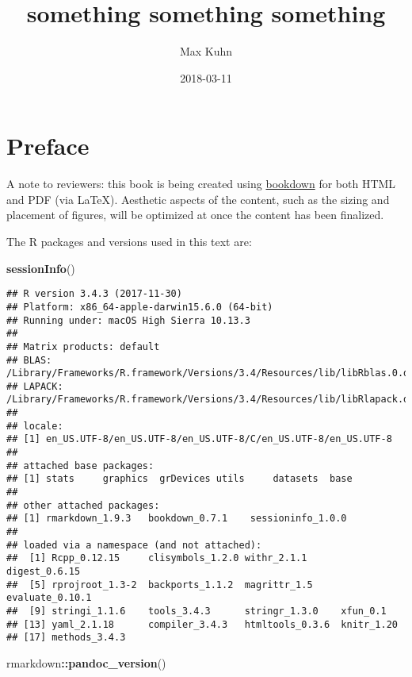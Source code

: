 \documentclass[numberinsequence]{krantz}
\title{something something something}
\author{Max Kuhn}
\date{2018-03-11}
\makeatletter
\newenvironment{Shaded}{\begin{snugshade}}{\end{snugshade}}
\newcommand{\KeywordTok}[1]{\textcolor[rgb]{0.13,0.29,0.53}{\textbf{#1}}}
\newcommand{\NormalTok}[1]{#1}
\newcommand{\OperatorTok}[1]{\textcolor[rgb]{0.81,0.36,0.00}{\textbf{#1}}}
\newenvironment{kframe}{%
\medskip{}
\setlength{\fboxsep}{.8em}
 \def\at@end@of@kframe{}%
 \ifinner\ifhmode%
  \def\at@end@of@kframe{\end{minipage}}%
  \begin{minipage}{\columnwidth}%
 \fi\fi%
 \def\FrameCommand##1{\hskip\@totalleftmargin \hskip-\fboxsep
 \colorbox{shadecolor}{##1}\hskip-\fboxsep
     \hskip-\linewidth \hskip-\@totalleftmargin \hskip\columnwidth}%
 \MakeFramed {\advance\hsize-\width
   \@totalleftmargin\z@ \linewidth\hsize
   \@setminipage}}%
 {\par\unskip\endMakeFramed%
 \at@end@of@kframe}
\renewenvironment{Shaded}{\begin{kframe}}{\end{kframe}}
\makeatother
\begin{document}
\maketitle


\thispagestyle{empty}


\setlength{\abovedisplayskip}{-5pt}
\setlength{\abovedisplayshortskip}{-5pt}

{
\hypersetup{linkcolor=}
\setcounter{tocdepth}{2}
\tableofcontents
}
\hypertarget{preface}{%
\section*{Preface}\label{preface}}


A note to reviewers: this book is being created using
\href{https://bookdown.org}{bookdown} for both HTML and PDF (via LaTeX).
Aesthetic aspects of the content, such as the sizing and placement of
figures, will be optimized at once the content has been finalized.

The R packages and versions used in this text are:

\begin{Shaded}
\begin{Highlighting}[]
\KeywordTok{sessionInfo}\NormalTok{()}
\end{Highlighting}
\end{Shaded}

\begin{verbatim}
## R version 3.4.3 (2017-11-30)
## Platform: x86_64-apple-darwin15.6.0 (64-bit)
## Running under: macOS High Sierra 10.13.3
## 
## Matrix products: default
## BLAS: /Library/Frameworks/R.framework/Versions/3.4/Resources/lib/libRblas.0.dylib
## LAPACK: /Library/Frameworks/R.framework/Versions/3.4/Resources/lib/libRlapack.dylib
## 
## locale:
## [1] en_US.UTF-8/en_US.UTF-8/en_US.UTF-8/C/en_US.UTF-8/en_US.UTF-8
## 
## attached base packages:
## [1] stats     graphics  grDevices utils     datasets  base     
## 
## other attached packages:
## [1] rmarkdown_1.9.3   bookdown_0.7.1    sessioninfo_1.0.0
## 
## loaded via a namespace (and not attached):
##  [1] Rcpp_0.12.15     clisymbols_1.2.0 withr_2.1.1      digest_0.6.15   
##  [5] rprojroot_1.3-2  backports_1.1.2  magrittr_1.5     evaluate_0.10.1 
##  [9] stringi_1.1.6    tools_3.4.3      stringr_1.3.0    xfun_0.1        
## [13] yaml_2.1.18      compiler_3.4.3   htmltools_0.3.6  knitr_1.20      
## [17] methods_3.4.3
\end{verbatim}

\begin{Shaded}
\begin{Highlighting}[]
\NormalTok{rmarkdown}\OperatorTok{::}\KeywordTok{pandoc_version}\NormalTok{()}
\end{Highlighting}
\end{Shaded}
\end{document}
